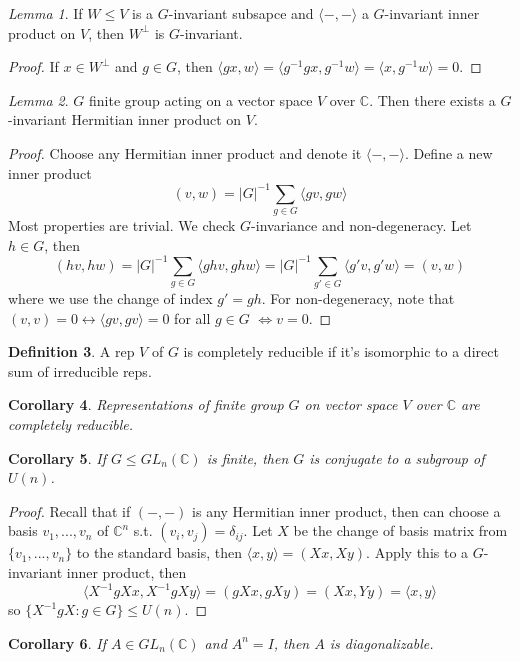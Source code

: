 \documentclass{article}
\theoremstyle{definition}
\newtheorem{defn}{Definition}[section]
\theoremstyle{remark}
\newtheorem{lem}[defn]{Lemma}
\theoremstyle{plain}
\newtheorem{crly}[defn]{Corollary}
\newcommand{\CC}{\mathbb{C}}
\begin{document}
\begin{lem}
If $W\le V$ is a $G$-invariant subsapce and $\langle-,-\rangle$ a $G$-invariant inner product on $V$, then $W^\perp$ is $G$-invariant.
\end{lem}
\begin{proof}
    If $x\in W^\perp$ and $g\in G$, then $\langle gx,w\rangle=\langle g^{-1}gx,g^{-1}w\rangle=\langle x,g^{-1}w\rangle=0$.
\end{proof}
\begin{lem}
    $G$ finite group acting on a vector space $V$ over $\CC$. Then there exists a $G$-invariant Hermitian inner product on $V$.
\end{lem}
\begin{proof}
    Choose any Hermitian inner product and denote it $\langle-,-\rangle$. Define a new inner product 
    \[(v,w)=|G|^{-1}\sum_{g\in G}\langle gv,gw\rangle\]
    Most properties are trivial. We check $G$-invariance and non-degeneracy. Let $h\in G$, then
    \[(hv,hw)=|G|^{-1}\sum_{g\in G}\langle ghv,ghw\rangle=|G|^{-1}\sum_{g'\in G}\langle g'v,g'w\rangle=(v,w)\]
    where we use the change of index $g'=gh$. For non-degeneracy, note that $(v,v)=0\leftrightarrow\langle gv,gv\rangle=0$ for all $g\in G$ $\Leftrightarrow v=0$.
\end{proof}
\begin{defn}
    A rep $V$ of $G$ is completely reducible if it's isomorphic to a direct sum of irreducible reps.
\end{defn}
\begin{crly}
    Representations of finite group $G$ on vector space $V$ over $\CC$ are completely reducible.
\end{crly}
\begin{crly}
    If $G\le GL_n(\CC)$ is finite, then $G$ is conjugate to a subgroup of $U(n)$.
\end{crly}
\begin{proof}
    Recall that if $(-,-)$ is any Hermitian inner product, then can choose a basis $v_1,...,v_n$ of $\CC^n$ s.t. $(v_i,v_j)=\delta_{ij}$. Let $X$ be the change of basis matrix from $\{v_1,...,v_n\}$ to the standard basis, then $\langle x,y\rangle=(Xx,Xy)$. Apply this to a $G$-invariant inner product, then 
    \[\langle X^{-1}gXx,X^{-1}gXy\rangle = (gXx,gXy)=(Xx,Yy)=\langle x,y\rangle\]
    so $\{X^{-1}gX:g\in G\}\le U(n)$.
\end{proof}
\begin{crly}
    If $A\in GL_n(\CC)$ and $A^n=I$, then $A$ is diagonalizable.
\end{crly}
\end{document}
